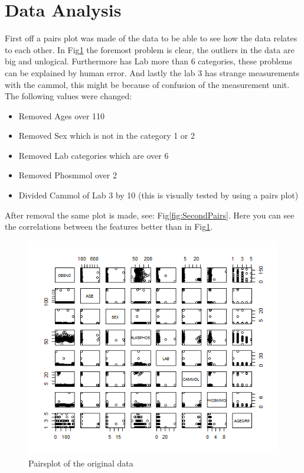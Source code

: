 \documentclass{article}
\begin{document}
  \section{Data Analysis}
    First off a pairs plot was made of the data to be able to see how the data relates to each other.
    In Fig\ref{fig:FirstPairs} the foremost problem is clear, the outliers in the data are big and unlogical.
    Furthermore has Lab more than 6 categories, these problems can be explained by human error.
    And lastly the lab 3 has strange measurements with the cammol, this might be because of confusion of the measurement unit.
    The following values were changed:
    \begin{itemize}
      \item Removed Ages over 110
      \item Removed Sex which is not in the category 1 or 2
      \item Removed Lab categories which are over 6
      \item Removed Phosmmol over 2
      \item Divided Cammol of Lab 3 by 10 (this is visually tested by using a pairs plot)
    \end{itemize}
    After removal the same plot is made, see: Fig\ref{fig:SecondPairs}.
    Here you can see the correlations between the features better than in Fig\ref{fig:FirstPairs}.
    \begin{figure}[H]
        \centering
        \includegraphics[scale=0.5]{../results/FirstPairs.png}
        \caption{Pairsplot of the original data}
        \label{fig:FirstPairs}
    \end{figure}
\end{document}
